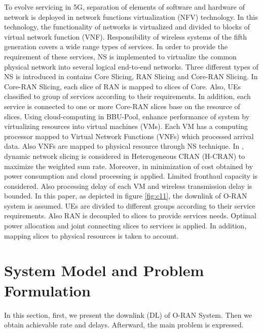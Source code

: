 \documentclass[conference]{IEEEtran}
\begin{document}
To evolve servicing in 5G, separation of elements of software and hardware of network is deployed in network functions virtualization (NFV) technology. In this technology, the functionality of networks is virtualized and divided to blocks of virtual network function (VNF).
Responsibility of wireless systems of the fifth generation covers a wide range types of services. In order to provide the requirement of these services, NS is implemented to virtualize the common physical network into several logical end-to-end networks. Three different types of NS is introduced in \cite{ns1} contains Core Slicing, RAN Slicing and Core-RAN Slicing. In Core-RAN Slicing, each slice of RAN is mapped to slices of Core. Also, UEs classified to group of services according to their requirements. In addition, each service is connected to one or more Core-RAN slices base on the resource of slices.
Using cloud-computing in BBU-Pool, enhance performance of system by virtualizing resources
into virtual machines (VMs).
Each VM has a computing processor mapped to Virtual Network Functions (VNFs) which processed arrival data. Also VNFs are mapped to physical resource through NS technique\cite{frdl,luong2018novel,luong2018novel1}. 
\newline  
In \cite{lee2018dynamic}, dynamic network slicing is considered in Heterogeneous CRAN (H-CRAN) to maximize the weighted sum rate. Moreover, in \cite{frdl,luong2018novel,luong2018novel1} minimization of cost obtained by power consumption and cloud processing is applied. Limited fronthaul capacity is considered. Also processing delay of each VM and wireless transmission delay is bounded.\newline  
In this paper, as  depicted in figure \ref{fig:c11}, the downlink of O-RAN system is assumed. UEs are divided to different groups according to 
their service requirements. Also RAN is decoupled to slices to provide services needs. Optimal power allocation and joint connecting slices to services is applied. In addition, mapping slices to physical resources is taken to account.


\section{System Model and Problem Formulation}
In this section, first, we present the downlink (DL) of O-RAN System. Then we obtain achievable rate and delays.
Afterward, the main problem is expressed.
\end{document}
